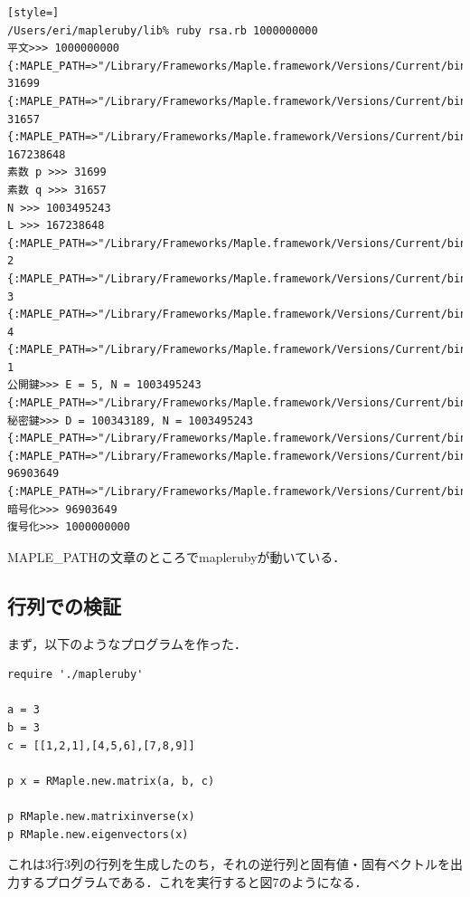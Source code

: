 \begin{lstlisting}[style=]
/Users/eri/mapleruby/lib% ruby rsa.rb 1000000000
平文>>> 1000000000
{:MAPLE_PATH=>"/Library/Frameworks/Maple.framework/Versions/Current/bin/maple"}
31699
{:MAPLE_PATH=>"/Library/Frameworks/Maple.framework/Versions/Current/bin/maple"}
31657
{:MAPLE_PATH=>"/Library/Frameworks/Maple.framework/Versions/Current/bin/maple"}
167238648
素数 p >>> 31699
素数 q >>> 31657
N >>> 1003495243
L >>> 167238648
{:MAPLE_PATH=>"/Library/Frameworks/Maple.framework/Versions/Current/bin/maple"}
2
{:MAPLE_PATH=>"/Library/Frameworks/Maple.framework/Versions/Current/bin/maple"}
3
{:MAPLE_PATH=>"/Library/Frameworks/Maple.framework/Versions/Current/bin/maple"}
4
{:MAPLE_PATH=>"/Library/Frameworks/Maple.framework/Versions/Current/bin/maple"}
1
公開鍵>>> E = 5, N = 1003495243
{:MAPLE_PATH=>"/Library/Frameworks/Maple.framework/Versions/Current/bin/maple"}
秘密鍵>>> D = 100343189, N = 1003495243
{:MAPLE_PATH=>"/Library/Frameworks/Maple.framework/Versions/Current/bin/maple"}
{:MAPLE_PATH=>"/Library/Frameworks/Maple.framework/Versions/Current/bin/maple"}
96903649
{:MAPLE_PATH=>"/Library/Frameworks/Maple.framework/Versions/Current/bin/maple"}
暗号化>>> 96903649
復号化>>> 1000000000
\end{lstlisting}\begin{description}
\item[MAPLE\_PATHの文章のところでmaplerubyが動いている．
]\end{description}
\subsection{行列での検証}
まず，以下のようなプログラムを作った．
\begin{lstlisting}[style=customRuby]
require './mapleruby'

a = 3
b = 3
c = [[1,2,1],[4,5,6],[7,8,9]]

p x = RMaple.new.matrix(a, b, c)

p RMaple.new.matrixinverse(x)
p RMaple.new.eigenvectors(x)
\end{lstlisting}
これは3行3列の行列を生成したのち，それの逆行列と固有値・固有ベクトルを出力するプログラムである．これを実行すると図7のようになる．

